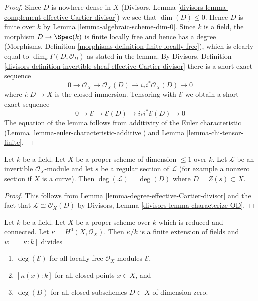\begin{proof}
Since $D$ is nowhere dense in $X$ (Divisors, Lemma
\ref{divisors-lemma-complement-effective-Cartier-divisor})
we see that $\dim(D) \leq 0$. Hence $D$ is finite over $k$
by Lemma \ref{lemma-algebraic-scheme-dim-0}. Since $k$ is a field,
the morphism $D \to \Spec(k)$ is finite locally free and hence has
a degree
(Morphisms, Definition \ref{morphisms-definition-finite-locally-free}),
which is clearly equal to $\dim_k \Gamma(D, \mathcal{O}_D)$
as stated in the lemma. By
Divisors, Definition
\ref{divisors-definition-invertible-sheaf-effective-Cartier-divisor}
there is a short exact sequence
$$
0 \to \mathcal{O}_X \to \mathcal{O}_X(D) \to i_*i^*\mathcal{O}_X(D) \to 0
$$
where $i : D \to X$ is the closed immersion. Tensoring with $\mathcal{E}$
we obtain a short exact sequence
$$
0 \to \mathcal{E} \to \mathcal{E}(D) \to i_*i^*\mathcal{E}(D) \to 0
$$
The equation of the lemma follows from additivity of
the Euler characteristic (Lemma \ref{lemma-euler-characteristic-additive})
and Lemma \ref{lemma-chi-tensor-finite}.
\end{proof}

\begin{lemma}
\label{lemma-degree-if-regular-section}
Let $k$ be a field.
Let $X$ be a proper scheme of dimension $\leq 1$ over $k$.
Let $\mathcal{L}$ be an invertible $\mathcal{O}_X$-module
and let $s$ be a regular section of $\mathcal{L}$ (for example
a nonzero section if $X$ is a curve). Then
$\deg(\mathcal{L}) = \deg(D)$ where $D = Z(s) \subset X$.
\end{lemma}

\begin{proof}
This follows from Lemma \ref{lemma-degree-effective-Cartier-divisor}
and the fact that $\mathcal{L} \cong \mathcal{O}_X(D)$ by
Divisors, Lemma \ref{divisors-lemma-characterize-OD}.
\end{proof}

\begin{lemma}
\label{lemma-divisible}
Let $k$ be a field. Let $X$ be a proper scheme over $k$
which is reduced and connected.
Let $\kappa = H^0(X, \mathcal{O}_X)$. Then $\kappa/k$ is a
finite extension of fields and $w = [\kappa : k]$ divides
\begin{enumerate}
\item $\deg(\mathcal{E})$ for all locally free $\mathcal{O}_X$-modules
$\mathcal{E}$,
\item $[\kappa(x) : k]$ for all closed points $x \in X$, and
\item $\deg(D)$ for all closed subschemes $D \subset X$
of dimension zero.
\end{enumerate}
\end{lemma}

